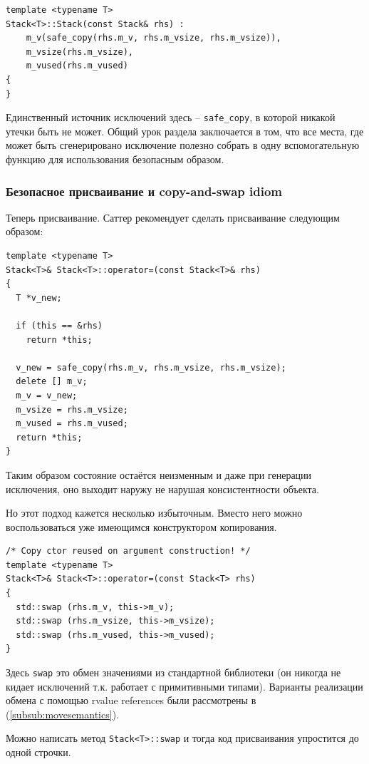 \documentclass[a4paper,12pt,oneside]{article}
\begin{document}
\begin{lstlisting}
template <typename T>
Stack<T>::Stack(const Stack& rhs) : 
    m_v(safe_copy(rhs.m_v, rhs.m_vsize, rhs.m_vsize)),
    m_vsize(rhs.m_vsize), 
    m_vused(rhs.m_vused) 
{
}
\end{lstlisting}

Единственный источник исключений здесь -- \lstinline!safe_copy!, в которой никакой утечки быть не может. Общий урок раздела заключается в том, что все места, где может быть сгенерировано исключение полезно собрать в одну вспомогательную функцию для использования безопасным образом.

\subsubsection{Безопасное присваивание и copy-and-swap idiom}\label{CopySwap}

Теперь присваивание. Саттер рекомендует сделать присваивание следующим образом:

\begin{lstlisting}
template <typename T>
Stack<T>& Stack<T>::operator=(const Stack<T>& rhs)
{
  T *v_new;

  if (this == &rhs)
    return *this;

  v_new = safe_copy(rhs.m_v, rhs.m_vsize, rhs.m_vsize);
  delete [] m_v;
  m_v = v_new;
  m_vsize = rhs.m_vsize; 
  m_vused = rhs.m_vused;
  return *this;
}
\end{lstlisting}

Таким образом состояние остаётся неизменным и даже при генерации исключения, оно выходит наружу не нарушая консистентности объекта.

Но этот подход кажется несколько избыточным. Вместо него можно воспользоваться уже имеющимся конструктором копирования.

\begin{lstlisting}
/* Copy ctor reused on argument construction! */
template <typename T>
Stack<T>& Stack<T>::operator=(const Stack<T> rhs)
{
  std::swap (rhs.m_v, this->m_v);
  std::swap (rhs.m_vsize, this->m_vsize);
  std::swap (rhs.m_vused, this->m_vused);
}
\end{lstlisting}

Здесь \lstinline!swap! это обмен значениями из стандартной библиотеки (он никогда не кидает исключений т.к. работает с примитивными типами). Варианты реализации обмена с помощью rvalue references были рассмотрены в (\ref{subsub:movesemantics}).

Можно написать метод \lstinline!Stack<T>::swap! и тогда код присваивания упростится до одной строчки.
\end{document}
